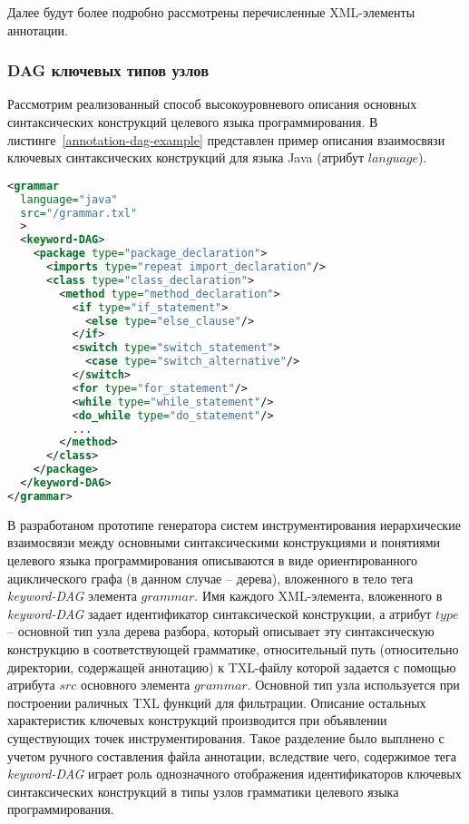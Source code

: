 
Далее будут более подробно рассмотрены перечисленные XML-элементы аннотации.

\subsubsection{DAG ключевых типов узлов}

Рассмотрим реализованный способ высокоуровневого описания основных синтаксических конструкций целевого языка программирования.
В листинге~\ref{annotation-dag-example} представлен пример описания взаимосвязи ключевых синтаксических конструкций для языка Java (атрибут $language$).

\begin{lstlisting}[frame=single, language=XML, label={annotation-dag-example}, caption={Пример DAG для грамматики языка Java}]
<grammar
  language="java"
  src="/grammar.txl"
  >
  <keyword-DAG>
    <package type="package_declaration">
      <imports type="repeat import_declaration"/>
      <class type="class_declaration">
        <method type="method_declaration">
          <if type="if_statement">
            <else type="else_clause"/>
          </if>
          <switch type="switch_statement">
            <case type="switch_alternative"/>
          </switch>
          <for type="for_statement"/>
          <while type="while_statement"/>
          <do_while type="do_statement"/>
          ...
        </method>
      </class>
    </package>
  </keyword-DAG>
</grammar>
\end{lstlisting}

В разработаном прототипе генератора систем инструментирования иерархические взаимосвязи между основными синтаксическими конструкциями и понятиями целевого языка программирования описываются в виде ориентированного ациклического графа (в данном случае -- дерева), вложенного в тело тега \textit{keyword-DAG} элемента $grammar$.
Имя каждого XML-элемента, вложенного в \textit{keyword-DAG} задает идентификатор синтаксической конструкции, а атрибут $type$ -- основной тип узла дерева разбора, который описывает эту синтаксическую конструкцию в соответствующей грамматике, относительный путь (относительно директории, содержащей аннотацию) к TXL-файлу которой задается с помощью атрибута $src$ основного элемента $grammar$.
Основной тип узла используется при построении раличных TXL функций для фильтрации.
Описание остальных характеристик ключевых конструкций производится при объявлении существующих точек инструментирования.
Такое разделение было выплнено с учетом ручного составления файла аннотации, вследствие чего, содержимое тега \textit{keyword-DAG} играет роль однозначного отображения идентификаторов ключевых синтаксических конструкций в типы узлов грамматики целевого языка программирования.

